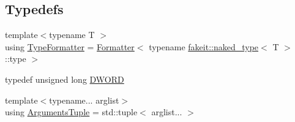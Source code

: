 \subsection*{Typedefs}
\begin{DoxyCompactItemize}
\item 
{\footnotesize template$<$typename T $>$ }\\using \mbox{\hyperlink{namespacefakeit_a61cf34d779d6e6933029ae3127e05fd4}{Type\+Formatter}} = \mbox{\hyperlink{structfakeit_1_1Formatter}{Formatter}}$<$ typename \mbox{\hyperlink{structfakeit_1_1naked__type}{fakeit\+::naked\+\_\+type}}$<$ T $>$\+::type $>$
\item 
typedef unsigned long \mbox{\hyperlink{namespacefakeit_a3d9fcff73186d3a22472ec6156db1f10}{D\+W\+O\+RD}}
\item 
{\footnotesize template$<$typename... arglist$>$ }\\using \mbox{\hyperlink{namespacefakeit_a476a37a598825e1b5dd67b3a176491a1}{Arguments\+Tuple}} = std\+::tuple$<$ arglist... $>$
\end{DoxyCompactItemize}
